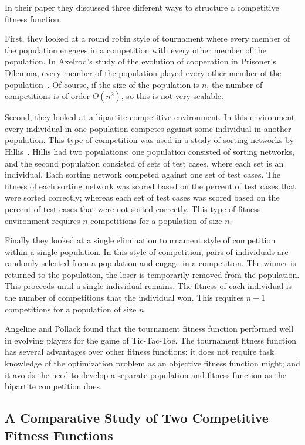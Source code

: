 In their paper they discussed three different ways to structure a competitive
fitness function.

First, they looked at a round robin style of tournament where every member of
the population engages in a competition with every other member of the
population. In Axelrod's study of the evolution of cooperation in Prisoner's
Dilemma, every member of the population played every other member of
the population~\cite{Axelrod1984}. Of course, if the size of the population is
\(n\), the number of competitions is of order \(O(n^2)\), so this is not
very scalable.

Second, they looked at a bipartite competitive environment. In this environment
every individual in one population competes against some individual in another
population. This type of competition was used in a study of sorting networks by
Hillis~\cite{Hillis:1990:CPI:87498.87560}. Hillis had two populations: one
population consisted of sorting networks, and the second population consisted of
sets of test cases, where each set is an individual. Each sorting network
competed against one set of test cases. The fitness of each sorting network was
scored based on the percent of test cases that were sorted correctly; whereas
each set of test cases was scored based on the percent of test cases that were
not sorted correctly. This type of fitness environment requires \(n\)
competitions for a population of size \(n\).

Finally they looked at a single elimination tournament style of
competition within a single population. In this style of competition, pairs of
individuals are randomly selected from a population and engage in a competition.
The winner is returned to the population, the loser is temporarily removed from
the population. This proceeds until a single individual remains. The fitness of
each individual is the number of competitions that the individual won. This
requires \(n-1\) competitions for a population of size \(n\).

Angeline and Pollack found that the tournament fitness function performed well
in evolving players for the game of Tic-Tac-Toe. The tournament fitness function
has several advantages over other fitness functions: it does not require task
knowledge of the optimization problem as an objective fitness function might;
and it avoids the need to develop a separate population and fitness function as
the bipartite competition does.

\subsection{A Comparative Study of Two Competitive Fitness Functions}

